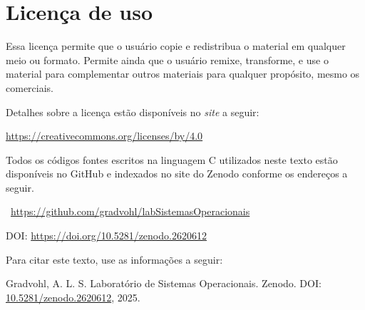 \chapter*{Licença de uso}\label{chp:licenca}
\doclicenseThis

Essa licença permite que o usuário copie e redistribua o material em qualquer meio ou formato. Permite ainda que o usuário remixe, transforme, e use o material para complementar outros materiais para qualquer propósito, mesmo os comerciais.

 Detalhes sobre a licença estão disponíveis no \textit{site} a seguir:
 \begin{center}
    \url{https://creativecommons.org/licenses/by/4.0}     
 \end{center}

Todos os códigos fontes escritos na linguagem C utilizados neste texto estão disponíveis no GitHub e indexados no site do Zenodo conforme os endereços a seguir.

\faGithub\ \url{https://github.com/gradvohl/labSistemasOperacionais}

DOI: \url{https://doi.org/10.5281/zenodo.2620612}

Para citar este texto, use as informações a seguir:

\noindent
{\sc Gradvohl, A. L. S.} Laboratório de Sistemas Operacionais. Zenodo. DOI: \href{http://doi.org/10.5281/zenodo.2620612}{10.5281/zenodo.2620612}, 2025.
